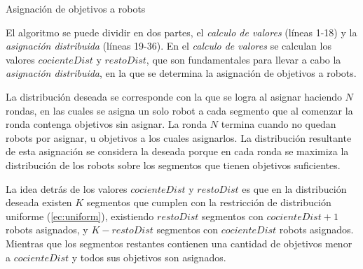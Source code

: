 \begin{algorithm}[H]
 \caption{Asignación de objetivos a robots}
 \label{alg:resolucionsubastasegmentos}
\end{algorithm}

\newpage

El algoritmo se puede dividir en dos partes, el \emph{calculo de valores}
(líneas 1-18) y la \emph{asignación distribuida} (líneas 19-36). En el
\emph{calculo de valores} se calculan los valores $cocienteDist$ y $restoDist$,
que son fundamentales para llevar a cabo la \emph{asignación distribuida}, en
la que se determina la asignación de objetivos a robots.

La distribución deseada se corresponde con la que se logra al asignar haciendo
$N$ rondas, en las cuales se asigna un solo robot a cada segmento que al
comenzar la ronda contenga objetivos sin asignar. La ronda $N$ termina cuando
no quedan robots por asignar, u objetivos a los cuales asignarlos. La distribución 
resultante de esta asignación se considera la deseada porque en cada ronda se maximiza la
distribución de los robots sobre los segmentos que tienen objetivos suficientes.


La idea detrás de los valores $cocienteDist$ y $restoDist$ es que en la
distribución deseada existen $K$ segmentos que cumplen con la restricción de
distribución uniforme (\ref{ec:uniform}), existiendo $restoDist$ segmentos con
$cocienteDist+1$ robots asignados, y $K-restoDist$ segmentos con
$cocienteDist$ robots asignados.  Mientras que los segmentos restantes contienen una cantidad de
objetivos menor a $cocienteDist$ y todos sus objetivos son asignados.



